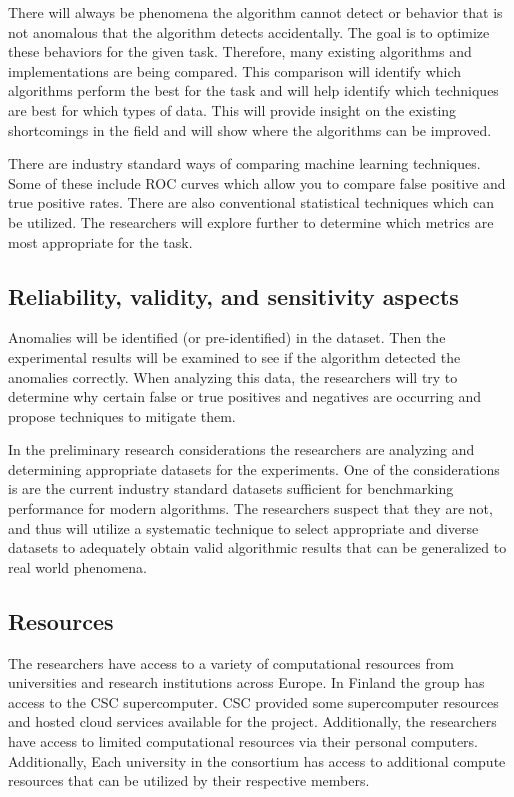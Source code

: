 There will always be phenomena the algorithm cannot detect or behavior that is not anomalous that the algorithm detects accidentally. The goal is to optimize these behaviors for the given task. Therefore, many existing algorithms and implementations are being compared. This comparison will identify which algorithms perform the best for the task and will help identify which techniques are best for which types of data. This will provide insight on the existing shortcomings in the field and will show where the algorithms can be improved.

There are industry standard ways of comparing machine learning techniques. Some of these include ROC curves which allow you to compare false positive and true positive rates. There are also conventional statistical techniques which can be utilized. The researchers will explore further to determine which metrics are most appropriate for the task.

\subsection{Reliability, validity, and sensitivity aspects}
Anomalies will be identified (or pre-identified) in the dataset. Then the experimental results will be examined to see if the algorithm detected the anomalies correctly. When analyzing this data, the researchers will try to determine why certain false or true positives and negatives are occurring and propose techniques to mitigate them.

In the preliminary research considerations the researchers are analyzing and determining appropriate datasets for the experiments. One of the considerations is are the current industry standard datasets sufficient for benchmarking performance for modern algorithms. The researchers suspect that they are not, and thus will utilize a systematic technique to select appropriate and diverse datasets to adequately obtain valid algorithmic results that can be generalized to real world phenomena. 


\subsection{Resources}

The researchers have access to a variety of computational resources from universities and research institutions across Europe. In Finland the group has access to the CSC supercomputer. CSC provided some supercomputer resources and hosted cloud services available for the project. Additionally, the researchers have access to limited computational resources via their personal computers. Additionally, Each university in the consortium has access to additional compute resources that can be utilized by their respective members.

